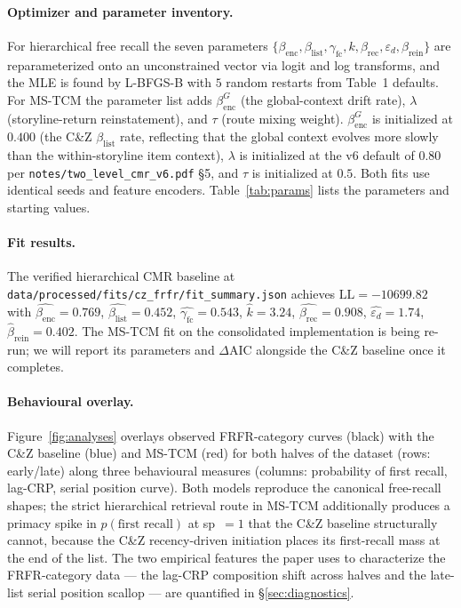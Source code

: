 \documentclass[10pt]{article}
\newcommand{\betaenc}{\beta_{\mathrm{enc}}}
\newcommand{\betaencG}{\beta_{\mathrm{enc}}^{G}}
\newcommand{\betalist}{\beta_{\mathrm{list}}}
\newcommand{\betarec}{\beta_{\mathrm{rec}}}
\newcommand{\gammafc}{\gamma_{\mathrm{fc}}}
\newcommand{\epsd}{\varepsilon_{d}}
\newcommand{\tauinit}{\tau}
\begin{document}
\paragraph{Optimizer and parameter inventory.}
For \citet{CornellZhang2025} hierarchical free recall the seven
parameters $\{\betaenc, \betalist, \gammafc, k, \betarec, \epsd,
\beta_{\mathrm{rein}}\}$ are reparameterized onto an unconstrained
vector via logit and log transforms, and the MLE is found by L-BFGS-B
with $5$ random restarts from \citeauthor{CornellZhang2025} Table~1
defaults. For MS-TCM the parameter list adds $\betaencG$ (the
global-context drift rate), $\lambda$ (storyline-return reinstatement),
and $\tauinit$ (route mixing weight). $\betaencG$ is initialized at
$0.400$ (the C\&Z $\betalist$ rate, reflecting that the global
context evolves more slowly than the within-storyline item context),
$\lambda$ is initialized at the v6 default of $0.80$ per
\texttt{notes/two\_level\_cmr\_v6.pdf} \S5, and $\tauinit$ is
initialized at $0.5$. Both fits use identical seeds and feature
encoders. Table~\ref{tab:params} lists the parameters and starting
values.



\paragraph{Fit results.}
The verified \citet{CornellZhang2025} hierarchical CMR baseline at
\texttt{data/processed/fits/cz\_frfr/fit\_summary.json} achieves
$\mathrm{LL} = -10699.82$ with $\hat{\betaenc} = 0.769$,
$\hat{\betalist} = 0.452$, $\hat{\gammafc} = 0.543$,
$\hat{k} = 3.24$, $\hat{\betarec} = 0.908$,
$\hat{\epsd} = 1.74$, $\hat{\beta}_{\mathrm{rein}} = 0.402$. The
MS-TCM fit on the consolidated implementation is being re-run; we
will report its parameters and $\Delta$AIC alongside the C\&Z
baseline once it completes.

\paragraph{Behavioural overlay.}
Figure~\ref{fig:analyses} overlays observed FRFR-category curves
(black) with the C\&Z baseline (blue) and MS-TCM (red) for both halves
of the dataset (rows: early/late) along three behavioural measures
(columns: probability of first recall, lag-CRP, serial position
curve). Both models reproduce the canonical free-recall shapes; the
strict hierarchical retrieval route in MS-TCM additionally produces a
primacy spike in $p(\text{first recall})$ at sp~$=1$ that the C\&Z
baseline structurally cannot, because the C\&Z recency-driven
initiation places its first-recall mass at the end of the list. The
two empirical features the paper uses to characterize the
FRFR-category data --- the lag-CRP composition shift across halves
and the late-list serial position scallop --- are quantified in
\S\ref{sec:diagnostics}.
\end{document}
